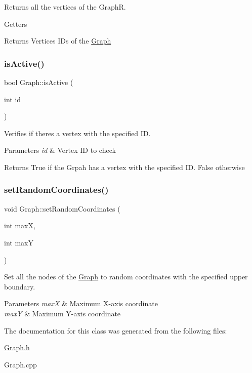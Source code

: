 Returns all the vertices of the GraphR. 

Getters \begin{DoxyReturn}{Returns}
Vertices I\+Ds of the \hyperlink{classGraph}{Graph} 
\end{DoxyReturn}
\mbox{\label{classGraph_a7ef34e66297418bbc2aa3ee80ab5c922}} 
\subsubsection{\texorpdfstring{is\+Active()}{isActive()}}
{\footnotesize\ttfamily bool Graph\+::is\+Active (\begin{DoxyParamCaption}\item[{int}]{id }\end{DoxyParamCaption})}



Verifies if there\textquotesingle{}s a vertex with the specified ID. 


\begin{DoxyParams}{Parameters}
{\em id} & Vertex ID to check \\
\hline
\end{DoxyParams}
\begin{DoxyReturn}{Returns}
True if the Grpah has a vertex with the specified ID. False otherwise 
\end{DoxyReturn}
\mbox{\label{classGraph_a0c904fc0ce662301c2ed25b1993ae06e}} 
\subsubsection{\texorpdfstring{set\+Random\+Coordinates()}{setRandomCoordinates()}}
{\footnotesize\ttfamily void Graph\+::set\+Random\+Coordinates (\begin{DoxyParamCaption}\item[{int}]{maxX,  }\item[{int}]{maxY }\end{DoxyParamCaption})}



Set all the nodes of the \hyperlink{classGraph}{Graph} to random coordinates with the specified upper boundary. 


\begin{DoxyParams}{Parameters}
{\em maxX} & Maximum X-\/axis coordinate \\
\hline
{\em maxY} & Maximum Y-\/axis coordinate \\
\hline
\end{DoxyParams}


The documentation for this class was generated from the following files\+:\begin{DoxyCompactItemize}
\item 
\hyperlink{Graph_8h}{Graph.\+h}\item 
Graph.\+cpp\end{DoxyCompactItemize}
